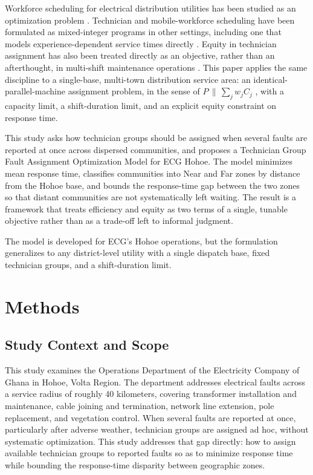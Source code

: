 \documentclass[11pt]{article}
\begin{document}
\vspace{0.25cm}
Workforce scheduling for electrical distribution utilities has been studied as an optimization problem \cite{Borba2019}. Technician and mobile-workforce scheduling have been formulated as mixed-integer programs in other settings, including one that models experience-dependent service times directly \cite{Yu2023,Eles2022}. Equity in technician assignment has also been treated directly as an objective, rather than an afterthought, in multi-shift maintenance operations \cite{Bhaba2024}. This paper applies the same discipline to a single-base, multi-town distribution service area: an identical-parallel-machine assignment problem, in the sense of $P \,\|\, \sum_j w_j C_j$ \cite{Pinedo2016}, with a capacity limit, a shift-duration limit, and an explicit equity constraint on response time.

\vspace{0.25cm}
This study asks how technician groups should be assigned when several faults are reported at once across dispersed communities, and proposes a Technician Group Fault Assignment Optimization Model for ECG Hohoe. The model minimizes mean response time, classifies communities into Near and Far zones by distance from the Hohoe base, and bounds the response-time gap between the two zones so that distant communities are not systematically left waiting. The result is a framework that treats efficiency and equity as two terms of a single, tunable objective rather than as a trade-off left to informal judgment.

\vspace{0.25cm}
The model is developed for ECG's Hohoe operations, but the formulation generalizes to any district-level utility with a single dispatch base, fixed technician groups, and a shift-duration limit.

\section*{Methods}

\subsection*{Study Context and Scope}

This study examines the Operations Department of the Electricity Company of Ghana in Hohoe, Volta Region. The department addresses electrical faults across a service radius of roughly 40 kilometers, covering transformer installation and maintenance, cable joining and termination, network line extension, pole replacement, and vegetation control. When several faults are reported at once, particularly after adverse weather, technician groups are assigned ad hoc, without systematic optimization. This study addresses that gap directly: how to assign available technician groups to reported faults so as to minimize response time while bounding the response-time disparity between geographic zones.
\end{document}
